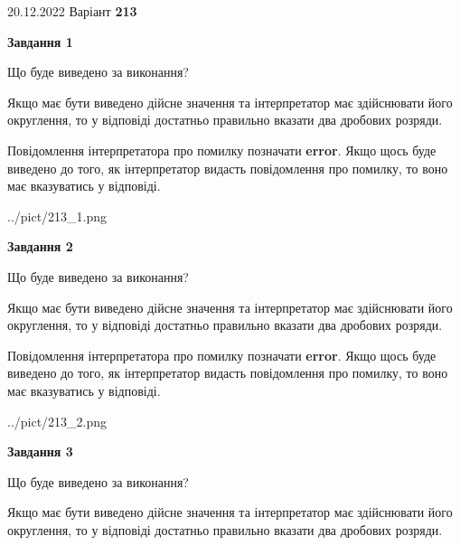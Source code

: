 \documentclass[12pt, ukrainian]{article}
\begin{document}
{20.12.2022 Варіант \No \textbf { 213 }\par}
{
\begin {Large}

{\begin {center}\textbf{Завдання 1}\end {center}}\par
Що буде виведено за виконання? \par

Якщо має бути виведено дійсне значення та інтерпретатор має здійснювати його округлення, 
то у відповіді достатньо правильно вказати два дробових розряди.

Повідомлення інтерпретатора про помилку позначати \textbf{error}.
Якщо щось буде виведено до того, як інтерпретатор видасть повідомлення про помилку, 
то воно має вказуватись у відповіді. \par

\begin{center}
	{../pict/213_1.png}
\end{center}
\newpage

{\begin {center}\textbf{Завдання 2}\end {center}}\par
Що буде виведено за виконання? \par

Якщо має бути виведено дійсне значення та інтерпретатор має здійснювати його округлення, 
то у відповіді достатньо правильно вказати два дробових розряди.

Повідомлення інтерпретатора про помилку позначати \textbf{error}.
Якщо щось буде виведено до того, як інтерпретатор видасть повідомлення про помилку, 
то воно має вказуватись у відповіді. \par

\begin{center}
	{../pict/213_2.png}
\end{center}
\newpage

{\begin {center}\textbf{Завдання 3}\end {center}}\par
Що буде виведено за виконання? \par

Якщо має бути виведено дійсне значення та інтерпретатор має здійснювати його округлення, 
то у відповіді достатньо правильно вказати два дробових розряди.


\end{Large}}
\end{document}
